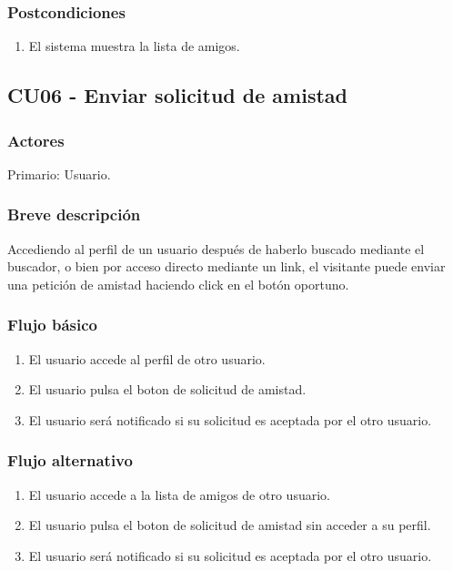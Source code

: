 \documentclass[12pt, a4paper, titlepage]{article}
\begin{document}
\subsubsection{Postcondiciones}
\begin{enumerate}
	\item El sistema muestra la lista de amigos.
\end{enumerate}



\subsection{CU06 - Enviar solicitud de amistad}
\subsubsection{Actores}
Primario: Usuario.
\subsubsection{Breve descripción}
 Accediendo al perfil de un usuario después de haberlo buscado mediante el buscador, o bien por acceso directo mediante un link, el visitante puede enviar una petición de amistad haciendo click en el botón oportuno.
\subsubsection{Flujo básico}
\begin{enumerate}
	\item El usuario accede al perfil de otro usuario.
	\item El usuario pulsa el boton de solicitud de amistad.
	\item El usuario será notificado si su solicitud es aceptada por el otro usuario.
\end{enumerate}
\subsubsection{Flujo alternativo}
\begin{enumerate}
	\item El usuario accede a la lista de amigos de otro usuario.
	\item El usuario pulsa el boton de solicitud de amistad sin acceder a su perfil.
	\item El usuario será notificado si su solicitud es aceptada por el otro usuario.
\end{enumerate}
\end{document}
